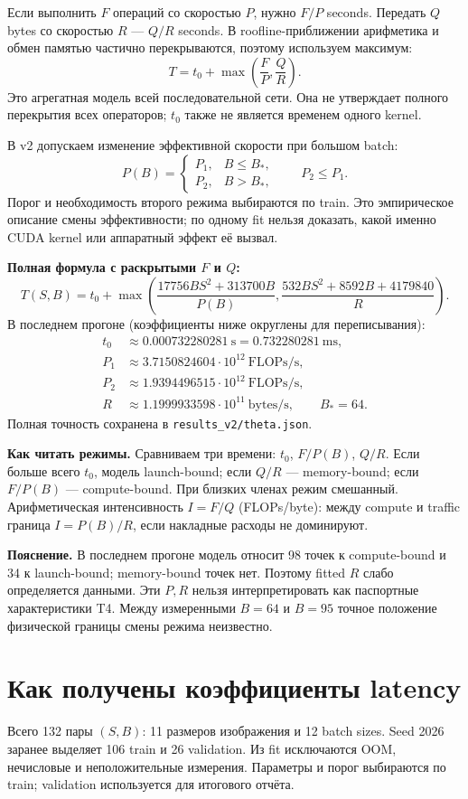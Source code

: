 \documentclass[11pt,a4paper]{article}
\newcommand{\page}[1]{\clearpage\section{#1}}
\newcommand{\note}[1]{\par\textbf{Пояснение.} #1\par}
\begin{document}
Если выполнить $F$ операций со скоростью $P$, нужно $F/P$ seconds.
Передать $Q$ bytes со скоростью $R$ --- $Q/R$ seconds. В roofline-приближении
арифметика и обмен памятью частично перекрываются, поэтому используем максимум:
\[
 T=t_0+\max\left(\frac{F}{P},\frac{Q}{R}\right).
\]
Это агрегатная модель всей последовательной сети. Она не утверждает полного
перекрытия всех операторов; $t_0$ также не является временем одного kernel.

В v2 допускаем изменение эффективной скорости при большом batch:
\[
 P(B)=\begin{cases}
 P_1,&B\le B_*,\\
 P_2,&B>B_*,
 \end{cases}\qquad P_2\le P_1.
\]
Порог и необходимость второго режима выбираются по train. Это эмпирическое
описание смены эффективности; по одному fit нельзя доказать, какой именно
CUDA kernel или аппаратный эффект её вызвал.

\textbf{Полная формула с раскрытыми $F$ и $Q$:}
\[
\boxed{T(S,B)=t_0+\max\left(
 \frac{17756BS^2+313700B}{P(B)},
 \frac{532BS^2+8592B+4179840}{R}\right).}
\]
В последнем прогоне (коэффициенты ниже округлены для переписывания):
\begin{align*}
 t_0&\approx0.000732280281\ \text{s}=0.732280281\ \text{ms},\\
 P_1&\approx3.7150824604\cdot10^{12}\ \text{FLOPs/s},\\
 P_2&\approx1.9394496515\cdot10^{12}\ \text{FLOPs/s},\\
 R&\approx1.1999933598\cdot10^{11}\ \text{bytes/s},\qquad B_*=64.
\end{align*}
Полная точность сохранена в \texttt{results\_v2/theta.json}.

\textbf{Как читать режимы.} Сравниваем три времени: $t_0$, $F/P(B)$, $Q/R$.
Если больше всего $t_0$, модель launch-bound; если $Q/R$ --- memory-bound;
если $F/P(B)$ --- compute-bound. При близких членах режим смешанный.
Арифметическая интенсивность $I=F/Q$ (FLOPs/byte): между compute и traffic
граница $I=P(B)/R$, если накладные расходы не доминируют.

\note{В последнем прогоне модель относит 98 точек к compute-bound и
34 к launch-bound; memory-bound точек нет. Поэтому fitted $R$ слабо
определяется данными. Эти $P,R$ нельзя интерпретировать как паспортные
характеристики T4. Между измеренными $B=64$ и $B=95$ точное положение
физической границы смены режима неизвестно.}

\page{Как получены коэффициенты latency}
Всего 132 пары $(S,B)$: 11 размеров изображения и 12 batch sizes.
Seed 2026 заранее выделяет 106 train и 26 validation. Из fit исключаются
OOM, нечисловые и неположительные измерения. Параметры и порог выбираются
по train; validation используется для итогового отчёта.
\end{document}
